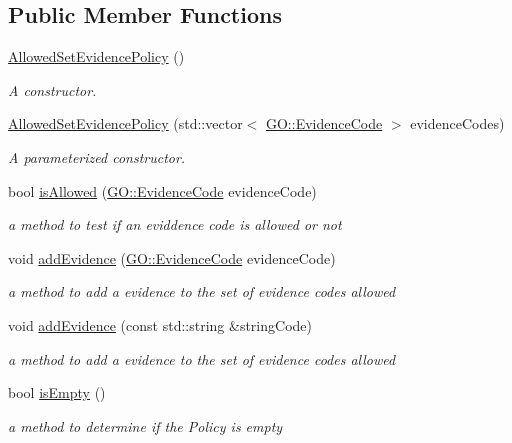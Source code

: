 \subsection*{Public Member Functions}
\begin{DoxyCompactItemize}
\item 
\hyperlink{classAllowedSetEvidencePolicy_af940574b5c998db67ce580555e1964d3}{Allowed\+Set\+Evidence\+Policy} ()
\begin{DoxyCompactList}\small\item\em A constructor. \end{DoxyCompactList}\item 
\hyperlink{classAllowedSetEvidencePolicy_a84458d133059ab286b3d3eaa8301d243}{Allowed\+Set\+Evidence\+Policy} (std\+::vector$<$ \hyperlink{namespaceGO_a4ce5387bbcdaec3648957c7903f2caf3}{G\+O\+::\+Evidence\+Code} $>$ evidence\+Codes)
\begin{DoxyCompactList}\small\item\em A parameterized constructor. \end{DoxyCompactList}\item 
bool \hyperlink{classAllowedSetEvidencePolicy_a5979a55da22e57d2faffaa0bdb77457b}{is\+Allowed} (\hyperlink{namespaceGO_a4ce5387bbcdaec3648957c7903f2caf3}{G\+O\+::\+Evidence\+Code} evidence\+Code)
\begin{DoxyCompactList}\small\item\em a method to test if an eviddence code is allowed or not \end{DoxyCompactList}\item 
void \hyperlink{classAllowedSetEvidencePolicy_a8a68cd6a472cab9df1dda7b3258618cf}{add\+Evidence} (\hyperlink{namespaceGO_a4ce5387bbcdaec3648957c7903f2caf3}{G\+O\+::\+Evidence\+Code} evidence\+Code)
\begin{DoxyCompactList}\small\item\em a method to add a evidence to the set of evidence codes allowed \end{DoxyCompactList}\item 
void \hyperlink{classAllowedSetEvidencePolicy_a1013d74c48b800c7dd0450c0fdaa4090}{add\+Evidence} (const std\+::string \&string\+Code)
\begin{DoxyCompactList}\small\item\em a method to add a evidence to the set of evidence codes allowed \end{DoxyCompactList}\item 
bool \hyperlink{classAllowedSetEvidencePolicy_ac54f499b3dfd0a55353014f1f277fe64}{is\+Empty} ()
\begin{DoxyCompactList}\small\item\em a method to determine if the Policy is empty \end{DoxyCompactList}\end{DoxyCompactItemize}


